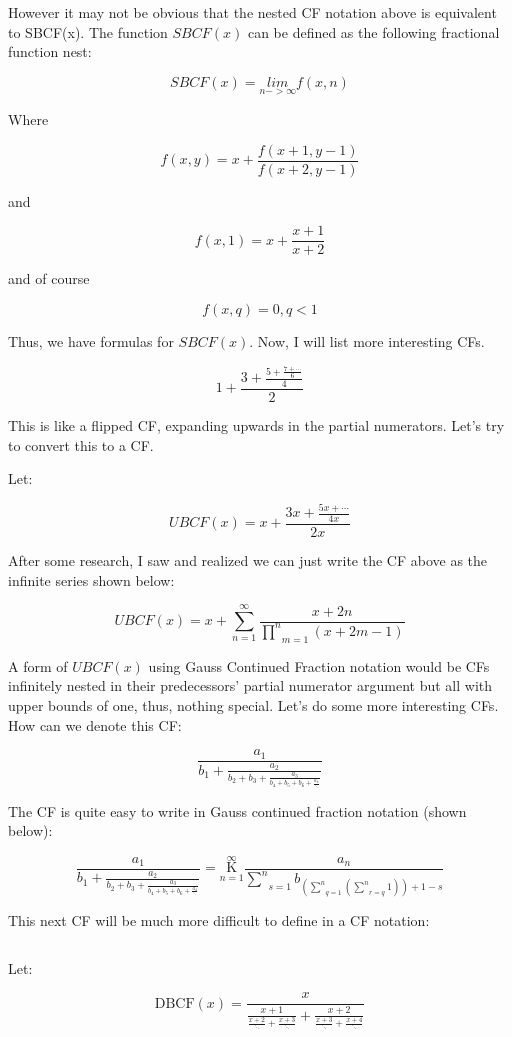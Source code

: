 \documentclass{article}
\begin{document}
However it may not be obvious that the nested CF notation above is equivalent to SBCF(x). The function $SBCF(x)$ can be defined as the following fractional function nest:

$$SBCF(x)=\underset{n->\infty}{lim}f(x,n)$$

Where

$$f(x,y)=x+\frac{f(x+1,y-1)}{f(x+2,y-1)}$$

and

$$f(x,1)=x+\frac{x+1}{x+2}$$

and of course

$$f(x,q)=0,q<1$$

Thus, we have formulas for $SBCF(x)$. Now, I will list more interesting CFs.

$$1+\frac{3+\frac{5+\frac{7+\cdots}{6}}{4}}{2}$$

This is like a flipped CF, expanding upwards in the partial numerators. Let’s try to convert this to a CF.

Let:

$$UBCF(x)=x+\frac{3x+\frac{5x+\cdots}{4x}}{2x}$$

After some research, I saw and realized we can just write the CF above as the infinite series shown below:

$$UBCF(x)=x+\underset{n=1}{\overset{\infty}{\sum}}\frac{x+2n}{\underset{m=1}{\overset{n}{\prod}}(x+2m-1)}$$

A form of $UBCF(x)$ using Gauss Continued Fraction notation would be CFs infinitely nested in their predecessors’ partial numerator argument but all with upper bounds of one, thus, nothing special. Let’s do some more interesting CFs. How can we denote this CF:

$$\frac{a_1}{b_1+\frac{a_2}{b_2+b_3+\frac{a_3}{b_4+b_5+b_6+\frac{a_4}{\ddots}}}}$$

The CF is quite easy to write in Gauss continued fraction notation (shown below):

$$\frac{a_1}{b_1+\frac{a_2}{b_2+b_3+\frac{a_3}{b_4+b_5+b_6+\frac{a_4}{\ddots}}}}=\underset{n=1}{\overset{\infty}{\mathrm K}} \frac{a_n}{\underset{s=1}{\overset{n}{\sum}} b_{(\underset{q=1}{\overset{n}{\sum}}(\underset{r=q}{\overset{n}{\sum}} 1))+1-s} }$$

This next CF will be much more difficult to define in a CF notation:

$${}$$

Let:

$$\text{DBCF}(x)=\frac{x}{\frac{x+1}{\frac{x+2}{\ddots}+\frac{x+3}{\ddots}}+\frac{x+2}{\frac{x+3}{\ddots}+\frac{x+4}{\ddots}}}$$
\end{document}
